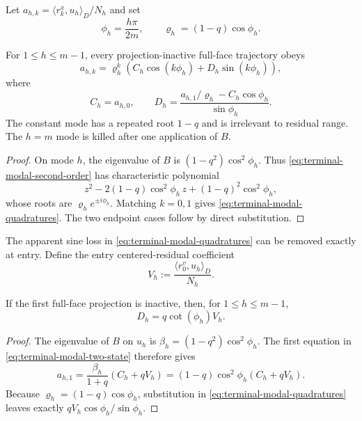 Let $a_{h,k}=\langle r_k^x,u_h\rangle_D/N_h$ and set
\begin{equation}
 \phi_h=\frac{h\pi}{2m},\qquad
 \varrho_h=(1-q)\cos\phi_h.
 \label{eq:terminal-modal-phase-radius}
\end{equation}

\begin{lemma}
\label{lem:terminal-modal-solution}
For $1\le h\le m-1$, every projection-inactive full-face trajectory obeys
\begin{equation}
 a_{h,k}=\varrho_h^k
 \left(C_h\cos(k\phi_h)+D_h\sin(k\phi_h)\right),
 \label{eq:terminal-modal-solution}
\end{equation}
where
\begin{equation}
 C_h=a_{h,0},\qquad
 D_h=\frac{a_{h,1}/\varrho_h-C_h\cos\phi_h}{\sin\phi_h}.
 \label{eq:terminal-modal-quadratures}
\end{equation}
The constant mode has a repeated root $1-q$ and is irrelevant to residual
range.  The $h=m$ mode is killed after one application of $B$.
\end{lemma}

\begin{proof}
On mode $h$, the eigenvalue of $B$ is
$(1-q^2)\cos^2\phi_h$.  Thus
\cref{eq:terminal-modal-second-order} has characteristic polynomial
\[
 z^2-2(1-q)\cos^2\phi_h\,z
 +(1-q)^2\cos^2\phi_h,
\]
whose roots are $\varrho_he^{\pm i\phi_h}$.  Matching $k=0,1$ gives
\eqref{eq:terminal-modal-quadratures}.  The two endpoint cases follow by
direct substitution.
\end{proof}

The apparent sine loss in \eqref{eq:terminal-modal-quadratures} can be
removed exactly at entry.  Define the entry centered-residual coefficient
\begin{equation}
 V_h:=\frac{\langle r_0^v,u_h\rangle_D}{N_h}.
 \label{eq:terminal-modal-entry-velocity}
\end{equation}

\begin{lemma}
\label{lem:terminal-modal-entry-velocity}
If the first full-face projection is inactive, then, for
$1\le h\le m-1$,
\begin{equation}
 D_h=q\cot(\phi_h)V_h.
 \label{eq:terminal-modal-entry-velocity-quadrature}
\end{equation}
\end{lemma}

\begin{proof}
The eigenvalue of $B$ on $u_h$ is
$\beta_h=(1-q^2)\cos^2\phi_h$.  The first equation in
\eqref{eq:terminal-modal-two-state} therefore gives
\[
 a_{h,1}
 =\frac{\beta_h}{1+q}(C_h+qV_h)
 =(1-q)\cos^2\phi_h(C_h+qV_h).
\]
Because $\varrho_h=(1-q)\cos\phi_h$, substitution in
\eqref{eq:terminal-modal-quadratures} leaves exactly
$qV_h\cos\phi_h/\sin\phi_h$.
\end{proof}

